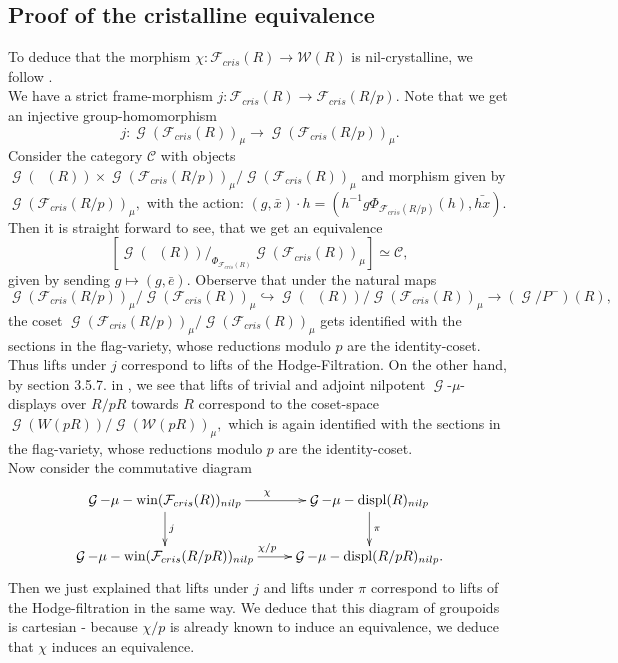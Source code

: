 \documentclass[a4paper,10,5 pt]{amsart}
\theoremstyle{definition}
\DeclareMathOperator{\Acris}{\mathbb{A}_{cris}}
\DeclareMathOperator{\G}{\mathcal{G}}
\begin{document}
\subsection{Proof of the cristalline equivalence}
To deduce that the morphism $\chi\colon \mathcal{F}_{cris}(R)\rightarrow \mathcal{W}(R)$ is nil-crystalline, we follow \cite[Prop. 9.7.]{Lau perfektoid}.
\\
We have a strict frame-morphism $j\colon \mathcal{F}_{cris}(R)\rightarrow \mathcal{F}_{cris}(R/p).$ Note that we get an injective group-homomorphism
$$
j\colon\G(\mathcal{F}_{cris}(R))_{\mu}\rightarrow \G(\mathcal{F}_{cris}(R/p))_{\mu}.
$$ Consider the category $\mathcal{C}$ with objects $\G(\Acris(R))\times \G(\mathcal{F}_{cris}(R/p))_{\mu}/ \G(\mathcal{F}_{cris}(R))_{\mu}$ and morphism given by $\G(\mathcal{F}_{cris}(R/p))_{\mu},$ with the action: $(g,\bar{x})\cdot h=(h^{-1}g\Phi_{\mathcal{F}_{cris}(R/p)}(h),\bar{hx}).$
\\
Then it is straight forward to see, that we get an equivalence
$$
[\G(\Acris(R))/_{\Phi_{\mathcal{F}_{cris}(R)}} \G(\mathcal{F}_{cris}(R))_{\mu}]\simeq \mathcal{C},
$$
given by sending $g\mapsto (g,\bar{e}).$
Oberserve that under the natural maps
$$
\G(\mathcal{F}_{cris}(R/p))_{\mu}/ \G(\mathcal{F}_{cris}(R))_{\mu}\hookrightarrow \G(\Acris(R))/ \G(\mathcal{F}_{cris}(R))_{\mu} \rightarrow (\G/P^{-})(R),
$$
the coset $\G(\mathcal{F}_{cris}(R/p))_{\mu}/ \G(\mathcal{F}_{cris}(R))_{\mu}$ gets identified with the sections in the flag-variety, whose reductions modulo $p$ are the identity-coset. Thus lifts under $j$ correspond to lifts of the Hodge-Filtration. On the other hand, by section 3.5.7. in \cite{BP}, we see that lifts of trivial and adjoint nilpotent $\G$-$\mu$-displays over $R/pR$ towards $R$ correspond to the coset-space $\G(W(pR))/\G(\mathcal{W}(pR))_{\mu},$ which is again identified with the sections in the flag-variety, whose reductions modulo $p$ are the identity-coset.
\\
Now consider the commutative diagram
$$
\xymatrix{
\G-\mu-\text{win}(\mathcal{F}_{cris}(R))_{nilp}\ar[r]^{\chi} \ar[d]^{j} & \G-\mu-\text{displ}(R)_{nilp} \ar[d]^{\pi} \\
\G-\mu-\text{win}(\mathcal{F}_{cris}(R/pR))_{nilp} \ar[r]^{\chi/p} & \G-\mu-\text{displ}(R/pR)_{nilp}.
}
$$
Then we just explained that lifts under $j$ and lifts under $\pi$ correspond to lifts of the Hodge-filtration in the same way. We deduce that this diagram of groupoids is cartesian - because $\chi/p$ is already known to induce an equivalence, we deduce that $\chi$ induces an equivalence.
\end{document}
